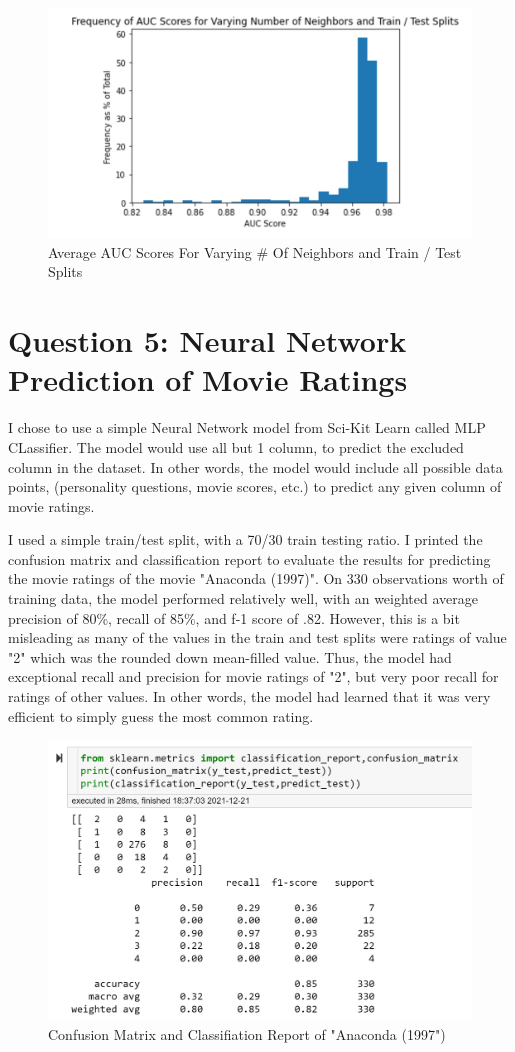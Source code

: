 \documentclass[12pt,twoside]{article}
\begin{document}
\begin{figure}[h!]
    \centering
    \includegraphics[scale=.9]{auc scores.png}
    \caption{Average AUC Scores For Varying # Of Neighbors and Train / Test Splits}
    \label{fig:my_label}
\end{figure}


\section*{Question 5: Neural Network Prediction of Movie Ratings}
I chose to use a simple Neural Network model from Sci-Kit Learn called MLP CLassifier. The model would use all but 1 column, to predict the excluded column in the dataset. In other words, the model would include all possible data points, (personality questions, movie scores, etc.) to predict any given column of movie ratings. 

I used a simple train/test split, with a 70/30 train testing ratio. I printed the confusion matrix and classification report to evaluate the results for predicting the movie ratings of the movie "Anaconda (1997)". On 330 observations worth of training data, the model performed relatively well, with an weighted average precision of 80\%, recall of 85\%, and f-1 score of .82. However, this is a bit misleading as many of the values in the train and test splits were ratings of value "2" which was the rounded down mean-filled value. Thus, the model had exceptional recall and precision for movie ratings of "2", but very poor recall for ratings of other values. In other words, the model had learned that it was very efficient to simply guess the most common rating.

\begin{figure}[h!]
    \centering
    \includegraphics[scale=.9]{ml precision.png}
    \caption{Confusion Matrix and Classifiation Report of "Anaconda (1997")}
    \label{fig:my_label}
\end{figure}
\end{document}
